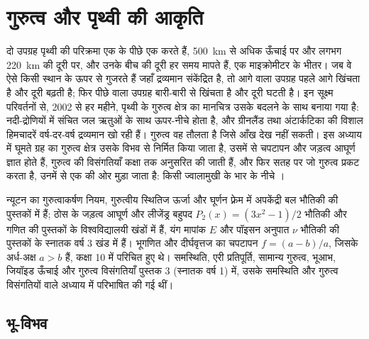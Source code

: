 \chapter{गुरुत्व और पृथ्वी की आकृति}\label{ch:b3:gravity-geodesy}

दो उपग्रह पृथ्वी की परिक्रमा एक के पीछे एक करते हैं,
\qty{500}{km} से अधिक ऊँचाई पर और लगभग \qty{220}{km} की दूरी पर,
और उनके बीच की दूरी हर समय मापते हैं, एक माइक्रोमीटर के भीतर।
जब वे ऐसे किसी स्थान के ऊपर से गुजरते हैं जहाँ द्रव्यमान संकेंद्रित है, तो आगे वाला उपग्रह पहले आगे खिंचता है
और दूरी बढ़ती है; फिर पीछे वाला उपग्रह बारी-बारी से खिंचता है और दूरी घटती है।
इन सूक्ष्म परिवर्तनों से, 2002 से हर महीने, पृथ्वी के गुरुत्व क्षेत्र का
मानचित्र उसके बदलने के साथ बनाया गया है: नदी-द्रोणियों में संचित जल
ऋतुओं के साथ ऊपर-नीचे होता है, और ग्रीनलैंड तथा अंटार्कटिका की विशाल हिमचादरें
वर्ष-दर-वर्ष द्रव्यमान खो रही हैं। गुरुत्व वह तौलता है जिसे आँख
देख नहीं सकती। इस अध्याय में घूमते ग्रह का गुरुत्व क्षेत्र उसके विभव से
निर्मित किया जाता है, उसमें से चपटापन और जड़त्व आघूर्ण ज्ञात होते हैं,
गुरुत्व की विसंगतियाँ कक्षा तक अनुसरित की जाती हैं, और फिर सतह पर जो
गुरुत्व प्रकट करता है, उनमें से एक की ओर मुड़ा जाता है: किसी ज्वालामुखी के भार के नीचे ।

\begin{recall}
न्यूटन का गुरुत्वाकर्षण नियम, गुरुत्वीय स्थितिज ऊर्जा और
घूर्णन फ़्रेम में अपकेंद्री बल भौतिकी की पुस्तकों में हैं; ठोस के जड़त्व आघूर्ण
और लीजेंड्र बहुपद $P_2(x) = (3x^2 - 1)/2$ भौतिकी और गणित की
पुस्तकों के विश्वविद्यालयी खंडों में हैं, यंग मापांक $E$ और
पॉइसन अनुपात $\nu$ भौतिकी की पुस्तकों के स्नातक वर्ष 3 खंड में हैं। भूगणित और
दीर्घवृत्तज का चपटापन $f = (a - b)/a$, जिसके अर्ध-अक्ष $a > b$ हैं, कक्षा 10 में
परिचित हुए थे। समस्थिति, एरी प्रतिपूर्ति, सामान्य गुरुत्व, भूआभ, जियॉइड
ऊँचाई और गुरुत्व विसंगतियाँ पुस्तक 3 (स्नातक वर्ष 1) में, उसके
समस्थिति और गुरुत्व विसंगतियों वाले अध्याय में परिभाषित की गई थीं।
\end{recall}

\section{भू-विभव}

